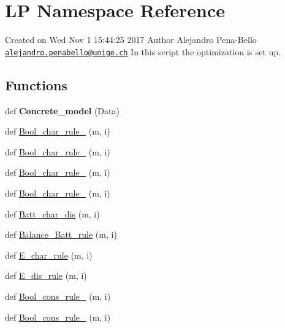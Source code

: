 \hypertarget{namespace_l_p}{}\section{LP Namespace Reference}
\label{namespace_l_p}


Created on Wed Nov 1 15\+:44\+:25 2017 Author Alejandro Pena-\/\+Bello \href{mailto:alejandro.penabello@unige.ch}{\tt alejandro.\+penabello@unige.\+ch} In this script the optimization is set up.  


\subsection*{Functions}
\begin{DoxyCompactItemize}
\item 
\mbox{\label{namespace_l_p_aff8a41d69b2aa8c8092b2aedd2eb3df6}} 
def {\bfseries Concrete\+\_\+model} (Data)
\item 
def \mbox{\hyperlink{namespace_l_p_adad40054f3f8a78955c488f1ece50fed}{Bool\+\_\+char\+\_\+rule\+\_}} (m, i)
\item 
def \mbox{\hyperlink{namespace_l_p_aabc88e88fcb3e47650195e6e8aa72578}{Bool\+\_\+char\+\_\+rule\+\_}} (m, i)
\item 
def \mbox{\hyperlink{namespace_l_p_a5e586c9382ca19f09272983cfec619a6}{Bool\+\_\+char\+\_\+rule\+\_}} (m, i)
\item 
def \mbox{\hyperlink{namespace_l_p_a1507e408c138290f403907a50e2b5d1c}{Bool\+\_\+char\+\_\+rule\+\_}} (m, i)
\item 
def \mbox{\hyperlink{namespace_l_p_acce964cd8e67ad18d750c9dd5b793ea9}{Batt\+\_\+char\+\_\+dis}} (m, i)
\item 
def \mbox{\hyperlink{namespace_l_p_a4dc6c0a11259a3e6c48c358aec140385}{Balance\+\_\+\+Batt\+\_\+rule}} (m, i)
\item 
def \mbox{\hyperlink{namespace_l_p_aac61ce084b61fa22a2546dafc494bcb0}{E\+\_\+char\+\_\+rule}} (m, i)
\item 
def \mbox{\hyperlink{namespace_l_p_ab78ac81e78bfa9c6a030d20f4422d4ab}{E\+\_\+dis\+\_\+rule}} (m, i)
\item 
def \mbox{\hyperlink{namespace_l_p_a85d28f45143d7ae45b7e2358dfe14923}{Bool\+\_\+cons\+\_\+rule\+\_}} (m, i)
\item 
def \mbox{\hyperlink{namespace_l_p_a748be39fe52af9daef16738ff06030b7}{Bool\+\_\+cons\+\_\+rule\+\_}} (m, i)
\item 

\end{DoxyCompactItemize}
